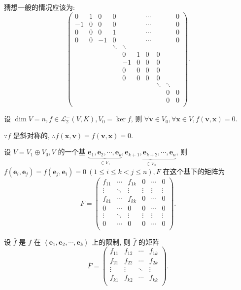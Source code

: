 \documentclass[color=black,device=normal,lang=cn,mode=geye]{elegantnote}
\begin{document}
猜想一般的情况应该为:
\[\begin{pmatrix}
    0  & 1 & 0  & 0 &&& \cdots &&& 0 \\
    -1 & 0 & 0  & 0 &&& \cdots &&& 0 \\
    0  & 0 & 0  & 1 &&& \cdots &&& 0 \\
    0  & 0 & -1 & 0 &&& \cdots &&& 0 \\
    &&& \ddots & \ddots \\
    &&&& 0  & 1 & 0 & 0 \\
    &&&& -1 & 0 & 0 & 0 \\
    &&&& 0  & 0 & 0 & 0 \\
    &&&& 0  & 0 & 0 & 0 \\
    &&&&&&& \ddots & \ddots \\
    &&&&&&&& 0 & 0 \\
    &&&&&&&& 0 & 0 \\
\end{pmatrix}.\]

设 $\dim V=n,f\in\mathcal{L}_2^-(V,K),V_0=\ker f$, 则 $\forall\boldsymbol{v}\in V_0,\forall\boldsymbol{x}\in V,f(\boldsymbol{v},\boldsymbol{x})=0$.

$\because f$ 是斜对称的, $\therefore f(\boldsymbol{x},\boldsymbol{v})=f(\boldsymbol{v},\boldsymbol{x})=0$.

设 $V=V_1\oplus V_0,V$ 的一个基 $\underbrace{\boldsymbol{e}_1,\boldsymbol{e}_2,\cdots,\boldsymbol{e}_k}_{\in V_1},\underbrace{\boldsymbol{e}_{k+1},\boldsymbol{e}_{k+2},\cdots,\boldsymbol{e}_n}_{\in V_0}$, 则 $f(\boldsymbol{e}_i,\boldsymbol{e}_j)=f(\boldsymbol{e}_j,\boldsymbol{e}_i)=0\ (1\leq i \leq k<j\leq n),F$ 在这个基下的矩阵为
\[F=\begin{pmatrix}
    f_{11} & \cdots & f_{1k} & 0 & \cdots & 0 \\
    \vdots & \ddots & \vdots & \vdots & \vdots & \vdots \\
    f_{k1} & \cdots & f_{kk} & 0 & \cdots & 0 \\
    0      & \cdots & 0      & 0 & \cdots & 0 \\
    \vdots & \ddots & \vdots & \vdots & \vdots & \vdots \\
    0      & \cdots & 0      & 0 & \cdots & 0 \\
\end{pmatrix}.\]

设 $\bar{f}$ 是 $f$ 在 $\left<\boldsymbol{e}_1,\boldsymbol{e}_2,\cdots,\boldsymbol{e}_k\right>$ 上的限制, 则 $\bar{f}$ 的矩阵
\[\overline{F}=\begin{pmatrix}
    f_{11} & f_{12} & \cdots & f_{1k} \\
    f_{21} & f_{22} & \cdots & f_{2k} \\
    \vdots & \vdots & \ddots & \vdots \\
    f_{k1} & f_{k2} & \cdots & f_{kk} \\
\end{pmatrix}.\]
\end{document}
